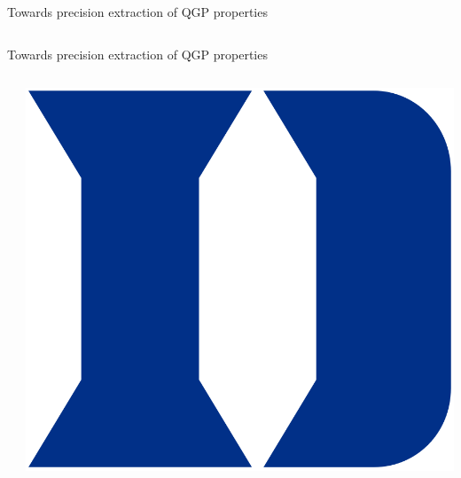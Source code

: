 \documentclass{beamer}
\begin{document}
\begin{frame}{Towards precision extraction of QGP properties}
\begin{columns}[T]
\begin{column}{.5\textwidth}
\begin{center}
      \end{center}
    \end{column}
  \end{columns}
\end{frame}


\begin{frame}{Towards precision extraction of QGP properties}
  \begin{columns}[T]
    \begin{column}{0.025\textwidth}
    \end{column}
    \begin{column}{0.05\textwidth}
      \raggedleft
      \includegraphics[width=\columnwidth]{duke}\\[.5ex]

\end{column}
\end{columns}
\end{frame}
\end{document}
